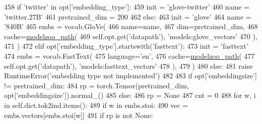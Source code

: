 \begin{DoxyCode}
458                     \textcolor{keywordflow}{if} \textcolor{stringliteral}{'twitter'} \textcolor{keywordflow}{in} opt[\textcolor{stringliteral}{'embedding\_type'}]:
459                         init = \textcolor{stringliteral}{'glove-twitter'}
460                         name = \textcolor{stringliteral}{'twitter.27B'}
461                         pretrained\_dim = 200
462                     \textcolor{keywordflow}{else}:
463                         init = \textcolor{stringliteral}{'glove'}
464                         name = \textcolor{stringliteral}{'840B'}
465                     embs = vocab.GloVe(
466                         name=name,
467                         dim=pretrained\_dim,
468                         cache=\hyperlink{namespaceparlai_1_1agents_1_1legacy__agents_1_1seq2seq_1_1utils__v0_a5fbd3301b67f00d6d146fb01c7cd7626}{modelzoo\_path}(
469                             self.opt.get(\textcolor{stringliteral}{'datapath'}), \textcolor{stringliteral}{'models:glove\_vectors'}
470                         ),
471                     )
472                 \textcolor{keywordflow}{elif} opt[\textcolor{stringliteral}{'embedding\_type'}].startswith(\textcolor{stringliteral}{'fasttext'}):
473                     init = \textcolor{stringliteral}{'fasttext'}
474                     embs = vocab.FastText(
475                         language=\textcolor{stringliteral}{'en'},
476                         cache=\hyperlink{namespaceparlai_1_1agents_1_1legacy__agents_1_1seq2seq_1_1utils__v0_a5fbd3301b67f00d6d146fb01c7cd7626}{modelzoo\_path}(
477                             self.opt.get(\textcolor{stringliteral}{'datapath'}), \textcolor{stringliteral}{'models:fasttext\_vectors'}
478                         ),
479                     )
480                 \textcolor{keywordflow}{else}:
481                     \textcolor{keywordflow}{raise} RuntimeError(\textcolor{stringliteral}{'embedding type not implemented'})
482 
483                 \textcolor{keywordflow}{if} opt[\textcolor{stringliteral}{'embeddingsize'}] != pretrained\_dim:
484                     rp = torch.Tensor(pretrained\_dim, opt[\textcolor{stringliteral}{'embeddingsize'}]).normal\_()
485                 \textcolor{keywordflow}{else}:
486                     rp = \textcolor{keywordtype}{None}
487                 cnt = 0
488                 \textcolor{keywordflow}{for} w, i \textcolor{keywordflow}{in} self.dict.tok2ind.items():
489                     \textcolor{keywordflow}{if} w \textcolor{keywordflow}{in} embs.stoi:
490                         vec = embs.vectors[embs.stoi[w]]
491                         \textcolor{keywordflow}{if} rp \textcolor{keywordflow}{is} \textcolor{keywordflow}{not} \textcolor{keywordtype}{None}:

\end{DoxyCode}
